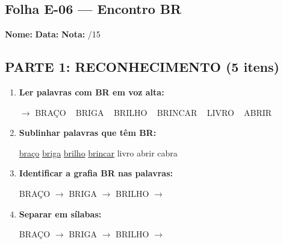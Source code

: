 \subsection{Folha E-06 --- Encontro BR}
\begin{exercicio}



\noindent\textbf{Nome:} \underline{\hspace{3.2cm}} \quad \textbf{Data:} \underline{\hspace{1.6cm}} \quad \textbf{Nota:} \underline{\hspace{0.9cm}}/15


\subsection*{PARTE 1: RECONHECIMENTO (5 itens)}

\begin{enumerate}

  \item \textbf{Ler palavras com BR em voz alta:}
  \begin{center}
  $\rightarrow$ BRAÇO ~ BRIGA ~ BRILHO ~ BRINCAR ~ LIVRO ~ ABRIR
  \end{center}

  \item \textbf{Sublinhar palavras que têm BR:}

\begin{center}
  \uline{braço} \quad \uline{briga} \quad \uline{brilho} \quad \uline{brincar} \quad livro \quad abrir \quad cabra
\end{center}

  \item \textbf{Identificar a grafia BR nas palavras:}
  \begin{center}
  BRAÇO $\rightarrow$ \underline{\hspace{1cm}} \quad BRIGA $\rightarrow$ \underline{\hspace{1cm}} \quad BRILHO $\rightarrow$ \underline{\hspace{1cm}}
  \end{center}

  \item \textbf{Separar em sílabas:}
  \begin{center}
  BRAÇO $\rightarrow$ \underline{\hspace{1.2cm}} \quad BRIGA $\rightarrow$ \underline{\hspace{1.2cm}} \quad BRILHO $\rightarrow$ \underline{\hspace{1.2cm}}
  \end{center}


\end{enumerate}
\end{exercicio}
